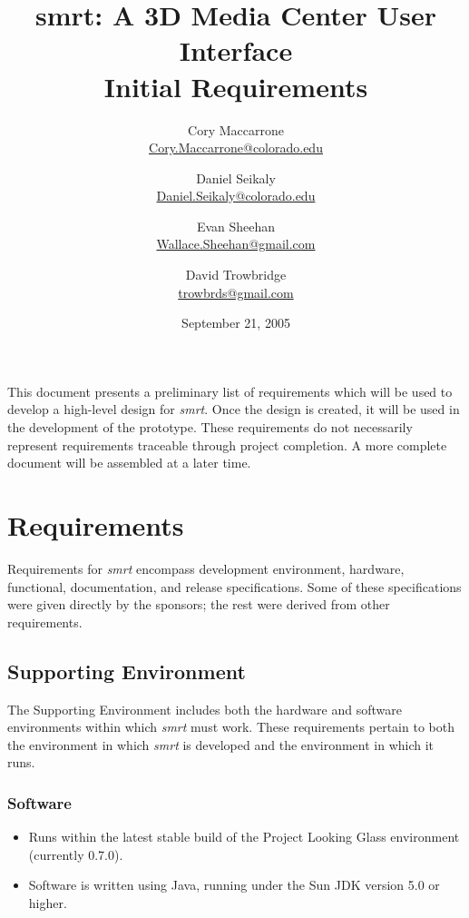 \documentclass[letterpaper, titlepage, 11pt]{article}
\title{
	smrt: A 3D Media Center User Interface
	\\
	Initial Requirements
}
\author{
	Cory Maccarrone  \\ {\small \href{mailto:Cory.Maccarrone@colorado.edu}{Cory.Maccarrone@colorado.edu}}
\and
	Daniel Seikaly   \\ {\small \href{mailto:Daniel.Seikaly@colorado.edu}{Daniel.Seikaly@colorado.edu}}
\and
	Evan Sheehan     \\ {\small \href{mailto:Wallace.Sheehan@gmail.com}{Wallace.Sheehan@gmail.com}}
\and
	David Trowbridge \\ {\small \href{mailto:trowbrds@gmail.com}{trowbrds@gmail.com}}
}
\date{September 21, 2005}
\begin{document}
\maketitle

\raggedbottom


\hspace{1em}
\pagebreak

\tableofcontents
\listoffigures
\pagebreak

\hspace{1em}
\pagebreak





This document presents a preliminary list of requirements which will be used to develop
a high-level design for \textit{smrt}.  Once the design is created, it will be used in the
development of the prototype.  These requirements do not necessarily represent requirements
traceable through project completion.  A more complete document will be assembled at a later
time.

\section{Requirements}
Requirements for \textit{smrt} encompass development environment, hardware,
functional, documentation, and release specifications. Some of these
specifications were given directly by the sponsors; the rest were derived from
other requirements.

\pagebreak

\subsection{Supporting Environment}
The Supporting Environment includes both the hardware and software environments
within which \textit{smrt} must work. These requirements pertain to both the
environment in which \textit{smrt} is developed and the environment in which it
runs.

\subsubsection{Software}
\begin{itemize}
\item Runs within the latest stable build of the Project Looking Glass environment (currently 0.7.0).
\item Software is written using Java, running under the Sun JDK version 5.0 or higher.
\end{itemize}
\end{document}
